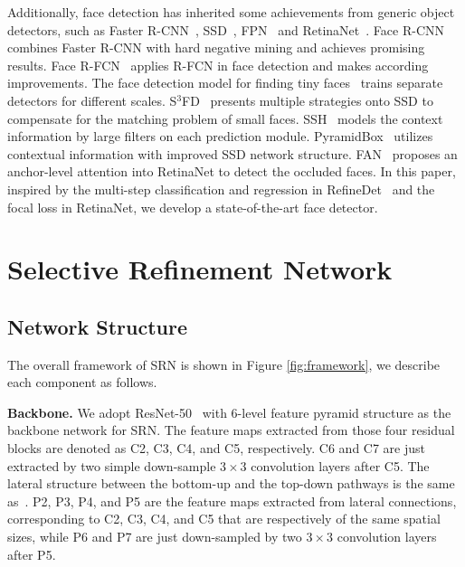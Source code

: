 \documentclass[letterpaper]{article} \usepackage{aaai19m}  \usepackage{times}  \usepackage{helvet}  \usepackage{courier}  \usepackage{url}  \usepackage{graphicx}  \usepackage{subfigure}
\begin{document}
Additionally, face detection has inherited some achievements from generic object detectors, such as Faster R-CNN~\cite{DBLP:journals/pami/RenHG017}, SSD~\cite{DBLP:conf/eccv/LiuAESRFB16}, FPN~\cite{DBLP:conf/cvpr/LinDGHHB17} and RetinaNet~\cite{DBLP:conf/iccv/LinPRK17}. 
Face R-CNN~\cite{wang2017face} combines Faster R-CNN with hard negative mining and achieves promising results. 
Face R-FCN~\cite{wang2017detecting} applies R-FCN in face detection and makes according improvements.
The face detection model for finding tiny faces~\cite{DBLP:conf/cvpr/HuR17} trains separate detectors for different scales. S$^{3}$FD~\cite{DBLP:conf/iccv/abs-1708-05237} presents multiple strategies onto SSD to compensate for the matching problem of small faces. SSH~\cite{DBLP:conf/iccv/NajibiSCD17} models the context information by large filters on each prediction module. PyramidBox~\cite{tang2018pyramidbox} utilizes contextual information with improved SSD network structure.
FAN~\cite{wang2017fan} proposes an anchor-level attention into RetinaNet to detect the occluded faces. In this paper, inspired by the multi-step classification and regression in RefineDet~\cite{DBLP:journals/corr/abs-1711-06897} and the focal loss in RetinaNet, we develop a state-of-the-art face detector.

\section{Selective Refinement Network}

\subsection{Network Structure}
The overall framework of SRN is shown in Figure \ref{fig:framework}, we describe each component as follows.

{\flushleft \textbf{Backbone.} }
We adopt ResNet-50~\cite{DBLP:conf/cvpr/HeZRS16} with 6-level feature pyramid structure as the backbone network for SRN. The feature maps extracted from those four residual blocks are denoted as C2, C3, C4, and C5, respectively. C6 and C7 are just extracted by two simple down-sample $3\times3$ convolution layers after C5. The lateral structure between the bottom-up and the top-down pathways is the same as~\cite{DBLP:conf/cvpr/LinDGHHB17}. P2, P3, P4, and P5 are the feature maps extracted from lateral connections, corresponding to C2, C3, C4, and C5 that are respectively of the same spatial sizes, while P6 and P7 are just down-sampled by two $3\times3$ convolution layers after P5.
\end{document}
